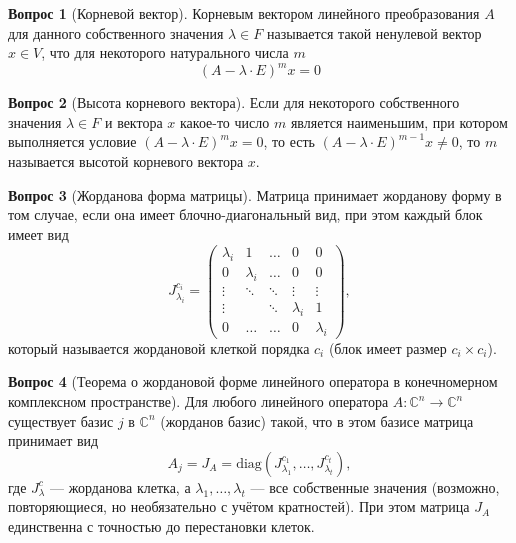 \documentclass[a4paper,11pt]{article}
\theoremstyle{remark}
\theoremstyle{definition}
\newtheorem{question}{Вопрос}
\begin{document}
\begin{question}[Корневой вектор]
Корневым вектором линейного преобразования \(A\) для данного собственного значения \(\lambda \in F\) называется такой ненулевой вектор \(x \in V\), что для некоторого натурального числа \(m\)
\begin{equation*}
 	(A - \lambda \cdot E)^mx = 0
\end{equation*} 
\end{question}


\begin{question}[Высота корневого вектора]
Если для некоторого собственного значения \(\lambda \in F\) и вектора \(x\) какое-то число \(m\) является наименьшим, при котором выполняется условие \((A - \lambda \cdot E)^mx = 0\), то есть \((A - \lambda \cdot E)^{m-1}x \neq 0\), то \(m\) называется высотой корневого вектора \(x\).
\end{question}


\begin{question}[Жорданова форма матрицы]
Матрица принимает жорданову форму в том случае, если она имеет блочно-диагональный вид, при этом каждый блок имеет вид
\begin{equation*}
	J^{c_i}_{\lambda_i} = 
	\begin{pmatrix}
		\lambda_i & 1 & \dots & 0 & 0 \\
		0 & \lambda_i & \dots & 0 & 0 \\
		\vdots & \ddots & \ddots & \vdots & \vdots \\
		\vdots & & \ddots & \lambda_i & 1 \\
		0 & \dots & \dots & 0 & \lambda_i
	\end{pmatrix},
\end{equation*}
который называется жордановой клеткой порядка \(c_i\) (блок имеет размер \(c_i \times c_i\)).
\end{question}


\begin{question}[Теорема о жордановой форме линейного оператора в конечномерном комплексном пространстве]
Для любого линейного оператора \(A: \mathbb{C}^n \rightarrow \mathbb{C}^n\) существует базис \(j\) в \(\mathbb{C}^n\) (жорданов базис) такой, что в этом базисе матрица принимает вид
\begin{equation*}
	A_j = J_A = \mathrm{diag}(J_{\lambda_1}^{c_1}, \dots, J_{\lambda_t}^{c_t}),
\end{equation*}
где \(J_{\lambda}^{c}\) --- жорданова клетка, а \(\lambda_1, \dots, \lambda_t\) --- все собственные значения (возможно, повторяющиеся, но необязательно с учётом кратностей). При этом матрица \(J_A\) единственна с точностью до перестановки клеток.
\end{question}
\end{document}
